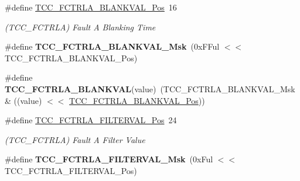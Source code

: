 \begin{DoxyCompactItemize}
\item 
\hypertarget{group___s_a_m_l21___t_c_c_gad4eefbd0bb6deb37327e62ce62331149}{}\#define \hyperlink{group___s_a_m_l21___t_c_c_gad4eefbd0bb6deb37327e62ce62331149}{T\+C\+C\+\_\+\+F\+C\+T\+R\+L\+A\+\_\+\+B\+L\+A\+N\+K\+V\+A\+L\+\_\+\+Pos}~16\label{group___s_a_m_l21___t_c_c_gad4eefbd0bb6deb37327e62ce62331149}

\begin{DoxyCompactList}\small\item\em (T\+C\+C\+\_\+\+F\+C\+T\+R\+L\+A) Fault A Blanking Time \end{DoxyCompactList}\item 
\hypertarget{group___s_a_m_l21___t_c_c_gaddfac5f58f88ca56bacb9b95a373012e}{}\#define {\bfseries T\+C\+C\+\_\+\+F\+C\+T\+R\+L\+A\+\_\+\+B\+L\+A\+N\+K\+V\+A\+L\+\_\+\+Msk}~(0x\+F\+Ful $<$$<$ T\+C\+C\+\_\+\+F\+C\+T\+R\+L\+A\+\_\+\+B\+L\+A\+N\+K\+V\+A\+L\+\_\+\+Pos)\label{group___s_a_m_l21___t_c_c_gaddfac5f58f88ca56bacb9b95a373012e}

\item 
\hypertarget{group___s_a_m_l21___t_c_c_gabc49e80fdf23d81661ee4af11e2f9865}{}\#define {\bfseries T\+C\+C\+\_\+\+F\+C\+T\+R\+L\+A\+\_\+\+B\+L\+A\+N\+K\+V\+A\+L}(value)~(T\+C\+C\+\_\+\+F\+C\+T\+R\+L\+A\+\_\+\+B\+L\+A\+N\+K\+V\+A\+L\+\_\+\+Msk \& ((value) $<$$<$ \hyperlink{group___s_a_m_l21___t_c_c_gad4eefbd0bb6deb37327e62ce62331149}{T\+C\+C\+\_\+\+F\+C\+T\+R\+L\+A\+\_\+\+B\+L\+A\+N\+K\+V\+A\+L\+\_\+\+Pos}))\label{group___s_a_m_l21___t_c_c_gabc49e80fdf23d81661ee4af11e2f9865}

\item 
\hypertarget{group___s_a_m_l21___t_c_c_gaab46a753411d94b285656e75d74b7f7c}{}\#define \hyperlink{group___s_a_m_l21___t_c_c_gaab46a753411d94b285656e75d74b7f7c}{T\+C\+C\+\_\+\+F\+C\+T\+R\+L\+A\+\_\+\+F\+I\+L\+T\+E\+R\+V\+A\+L\+\_\+\+Pos}~24\label{group___s_a_m_l21___t_c_c_gaab46a753411d94b285656e75d74b7f7c}

\begin{DoxyCompactList}\small\item\em (T\+C\+C\+\_\+\+F\+C\+T\+R\+L\+A) Fault A Filter Value \end{DoxyCompactList}\item 
\hypertarget{group___s_a_m_l21___t_c_c_gaaa1f3d81a0c9b6d774879dcfec118caa}{}\#define {\bfseries T\+C\+C\+\_\+\+F\+C\+T\+R\+L\+A\+\_\+\+F\+I\+L\+T\+E\+R\+V\+A\+L\+\_\+\+Msk}~(0x\+Ful $<$$<$ T\+C\+C\+\_\+\+F\+C\+T\+R\+L\+A\+\_\+\+F\+I\+L\+T\+E\+R\+V\+A\+L\+\_\+\+Pos)\label{group___s_a_m_l21___t_c_c_gaaa1f3d81a0c9b6d774879dcfec118caa}


\end{DoxyCompactItemize}
